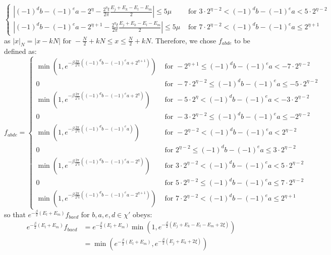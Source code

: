 \documentclass[aps,floatfix,10pt,amssymb,amsfont,amsmath,superscriptaddress,float,nofootinbib,longbibliography,nobalancelastpage,twocolumn]{revtex4-2}
\begin{document}
\begin{widetext}
\begin{equation}
\begin{cases}
     |(-1)^db-(-1)^ea-2^{\eta}-\frac{2^{\eta}t}{2\pi}\frac{E_j+E_k-E_l-E_m}{2}|\leq 5\mu&\text{ for }3\cdot 2^{\eta-2}< (-1)^db-(-1)^ea < 5\cdot 2^{\eta-2}\\
     |(-1)^db-(-1)^ea-2^{\eta+1}-\frac{2^{\eta}t}{2\pi}\frac{E_j+E_k-E_l-E_m}{2}|\leq 5\mu&\text{ for }7\cdot2^{\eta-2}< (-1)^db-(-1)^ea \leq 2^{\eta+1}
    \end{cases}
    \label{eq:conditions}
\end{equation}
as $|x|_N = |x - kN| \text{ for } -\frac{N}{2} + kN \leq x \leq \frac{N}{2} + kN$.
Therefore, we chose $f_{abde}$ to be defined as:
\begin{equation}
    f_{abde} = \begin{cases}
    \min(1,e^{-\beta\frac{2\pi}{2^{\eta}t}((-1)^db-(-1)^ea+2^{\eta+1})})&\text{ for }-2^{\eta+1}\leq (-1)^db-(-1)^ea < -7\cdot2^{\eta-2}\\
    0&\text{ for }-7\cdot2^{\eta-2}\leq (-1)^db-(-1)^ea \leq -5\cdot2^{\eta-2}\\
    \min(1,e^{-\beta\frac{2\pi}{2^{\eta}t}((-1)^db-(-1)^ea+2^{\eta})})&\text{ for }-5\cdot 2^{\eta}< (-1)^db-(-1)^ea < -3\cdot2^{\eta-2}\\
    0&\text{ for }-3\cdot2^{\eta-2}\leq (-1)^db-(-1)^ea \leq -2^{\eta-2}\\
     \min(1,e^{-\beta\frac{2\pi}{2^{\eta}t}((-1)^db-(-1)^ea)})&\text{ for }-2^{\eta-2}<(-1)^db-(-1)^ea < 2^{\eta-2}\\
    0&\text{ for }2^{\eta-2}\leq (-1)^db-(-1)^ea \leq 3\cdot2^{\eta-2}\\
     \min(1,e^{-\beta\frac{2\pi}{2^{\eta}t}((-1)^db-(-1)^ea-2^{\eta})})&\text{ for }3\cdot 2^{\eta-2}< (-1)^db-(-1)^ea < 5\cdot2^{\eta-2}\\
     0&\text{ for }5\cdot2^{\eta-2}\leq (-1)^db-(-1)^ea \leq 7\cdot2^{\eta-2}\\
     \min(1,e^{-\beta\frac{2\pi}{2^{\eta}t}((-1)^db-(-1)^ea-2^{\eta+1})})&\text{ for }7\cdot 2^{\eta-2}< (-1)^db-(-1)^ea \leq 2^{\eta+1}
    \end{cases}
\end{equation}
so that $e^{-\frac{\beta}{2}(E_l+E_m)}f_{baed}$ for $b, a, e, d \in \chi'$ obeys:
\begin{equation}
    \begin{aligned}
    e^{-\frac{\beta}{2}(E_l+E_m)}f_{baed} &= e^{-\frac{\beta}{2}(E_l+E_m)}\min(1,e^{-\frac{\beta}{2}(E_j+E_k-E_l-E_m + 2\xi)})\\
    &= \min(e^{-\frac{\beta}{2}(E_l+E_m)}, e^{-\frac{\beta}{2}(E_j+E_k + 2\xi)})\\

\end{aligned}
\end{equation}
\end{widetext}
\end{document}
